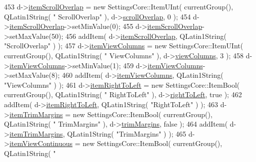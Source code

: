 \begin{DoxyCode}
453   d->\hyperlink{classOkular_1_1SettingsPrivate_a94f89e7be20cbb40594e9a029f6e5951}{itemScrollOverlap} = \textcolor{keyword}{new} SettingsCore::ItemUInt( currentGroup(), QLatin1String( \textcolor{stringliteral}{"
      ScrollOverlap"} ), d->\hyperlink{classOkular_1_1SettingsPrivate_af3c41a275314a6a6e94bfb4bb9bde572}{scrollOverlap}, 0 );
454   d->\hyperlink{classOkular_1_1SettingsPrivate_a94f89e7be20cbb40594e9a029f6e5951}{itemScrollOverlap}->setMinValue(0);
455   d->\hyperlink{classOkular_1_1SettingsPrivate_a94f89e7be20cbb40594e9a029f6e5951}{itemScrollOverlap}->setMaxValue(50);
456   addItem( d->\hyperlink{classOkular_1_1SettingsPrivate_a94f89e7be20cbb40594e9a029f6e5951}{itemScrollOverlap}, QLatin1String( \textcolor{stringliteral}{"ScrollOverlap"} ) );
457   d->\hyperlink{classOkular_1_1SettingsPrivate_ad9434765834a0e3d0b1a20668baa905c}{itemViewColumns} = \textcolor{keyword}{new} SettingsCore::ItemUInt( currentGroup(), QLatin1String( \textcolor{stringliteral}{"
      ViewColumns"} ), d->\hyperlink{classOkular_1_1SettingsPrivate_ad8904e535922fef778bc8b83639607d5}{viewColumns}, 3 );
458   d->\hyperlink{classOkular_1_1SettingsPrivate_ad9434765834a0e3d0b1a20668baa905c}{itemViewColumns}->setMinValue(1);
459   d->\hyperlink{classOkular_1_1SettingsPrivate_ad9434765834a0e3d0b1a20668baa905c}{itemViewColumns}->setMaxValue(8);
460   addItem( d->\hyperlink{classOkular_1_1SettingsPrivate_ad9434765834a0e3d0b1a20668baa905c}{itemViewColumns}, QLatin1String( \textcolor{stringliteral}{"ViewColumns"} ) );
461   d->\hyperlink{classOkular_1_1SettingsPrivate_ae1b0d4803230e42e6ff4a4266181bd3f}{itemRightToLeft} = \textcolor{keyword}{new} SettingsCore::ItemBool( currentGroup(), QLatin1String( \textcolor{stringliteral}{"
      RightToLeft"} ), d->\hyperlink{classOkular_1_1SettingsPrivate_ae3b7277848df4610de3f8a05d737cbf8}{rightToLeft},  \textcolor{keyword}{true}  );
462   addItem( d->\hyperlink{classOkular_1_1SettingsPrivate_ae1b0d4803230e42e6ff4a4266181bd3f}{itemRightToLeft}, QLatin1String( \textcolor{stringliteral}{"RightToLeft"} ) );
463   d->\hyperlink{classOkular_1_1SettingsPrivate_a980c4854d0545775b05ba317138a25d2}{itemTrimMargins} = \textcolor{keyword}{new} SettingsCore::ItemBool( currentGroup(), QLatin1String( \textcolor{stringliteral}{"
      TrimMargins"} ), d->\hyperlink{classOkular_1_1SettingsPrivate_a4f646d665119edc0a8aafc58897816f0}{trimMargins}, \textcolor{keyword}{false} );
464   addItem( d->\hyperlink{classOkular_1_1SettingsPrivate_a980c4854d0545775b05ba317138a25d2}{itemTrimMargins}, QLatin1String( \textcolor{stringliteral}{"TrimMargins"} ) );
465   d->\hyperlink{classOkular_1_1SettingsPrivate_a819238b76819053c13a29191b8766e21}{itemViewContinuous} = \textcolor{keyword}{new} SettingsCore::ItemBool( currentGroup(), QLatin1String( \textcolor{stringliteral}{"
}
\end{DoxyCode}
